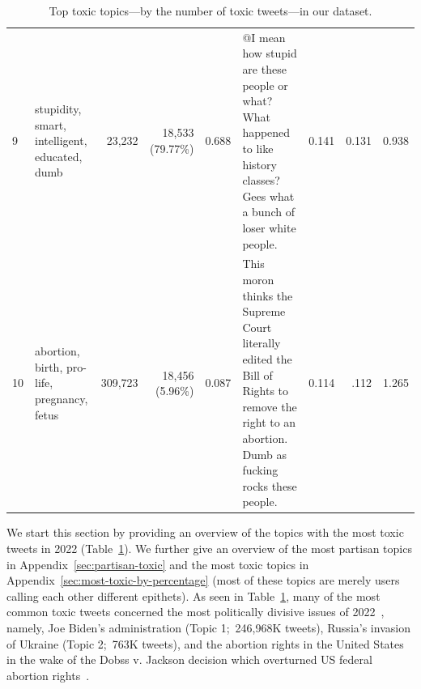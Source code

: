 \begin{table}
\begin{tabularx}{\textwidth}{lXrrrXrrr}
  9 & stupidity, smart, intelligent, educated, dumb & 23,232 & 18,533 (79.77\%)&0.688 &@I mean how stupid are these people or what?
What happened to like history classes?
Gees what a bunch of loser white people.&  0.141 &  0.131 & 0.938 \\

  10 & abortion, birth, pro-life, pregnancy, fetus &309,723 & 18,456 (5.96\%)&0.087& This moron thinks the Supreme Court literally edited the Bill of Rights to remove the right to an abortion. Dumb as fucking rocks these people.
 &  0.114 &.112 & 1.265 \\

\bottomrule
\end{tabularx}
\caption{Top toxic topics---by the number of toxic tweets---in our dataset.\label{table:toxic-topics}} 
\end{table}
We start this section by providing an overview of the topics with the most toxic tweets in 2022 (Table~\ref{table:toxic-topics}). We further give an overview of the most partisan topics in Appendix~\ref{sec:partisan-toxic} and the most toxic topics in Appendix~\ref{sec:most-toxic-by-percentage} (most of these topics are merely users calling each other different epithets). As seen in Table~\ref{table:toxic-topics}, many of the most common toxic tweets concerned the most politically divisive issues of 2022~\cite{Montanaro2022}, namely, Joe Biden's administration (Topic 1;~246,968K tweets), Russia's invasion of Ukraine (Topic 2;~763K tweets), and the abortion rights in the United States in the wake of the Dobss v. Jackson decision which overturned US federal abortion rights~\cite{StaffAborrtion2022}.

